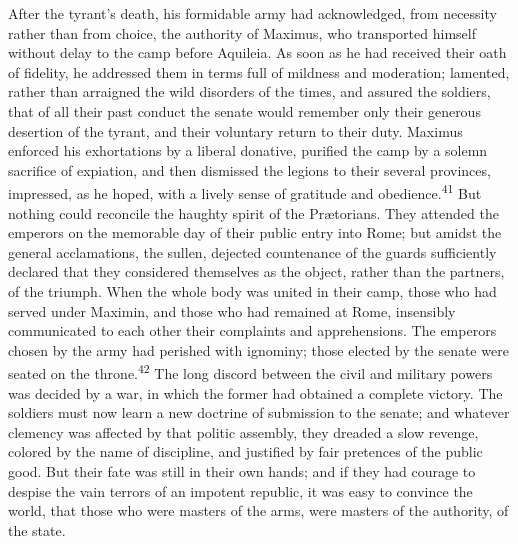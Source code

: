 After the tyrant’s death, his formidable army had acknowledged,
from necessity rather than from choice, the authority of Maximus,
who transported himself without delay to the camp before
Aquileia. As soon as he had received their oath of fidelity, he
addressed them in terms full of mildness and moderation;
lamented, rather than arraigned the wild disorders of the times,
and assured the soldiers, that of all their past conduct the
senate would remember only their generous desertion of the
tyrant, and their voluntary return to their duty. Maximus
enforced his exhortations by a liberal donative, purified the
camp by a solemn sacrifice of expiation, and then dismissed the
legions to their several provinces, impressed, as he hoped, with
a lively sense of gratitude and obedience.\textsuperscript{41} But nothing could
reconcile the haughty spirit of the Prætorians. They attended the
emperors on the memorable day of their public entry into Rome;
but amidst the general acclamations, the sullen, dejected
countenance of the guards sufficiently declared that they
considered themselves as the object, rather than the partners, of
the triumph. When the whole body was united in their camp, those
who had served under Maximin, and those who had remained at Rome,
insensibly communicated to each other their complaints and
apprehensions. The emperors chosen by the army had perished with
ignominy; those elected by the senate were seated on the throne.\textsuperscript{42}
The long discord between the civil and military powers was
decided by a war, in which the former had obtained a complete
victory. The soldiers must now learn a new doctrine of submission
to the senate; and whatever clemency was affected by that politic
assembly, they dreaded a slow revenge, colored by the name of
discipline, and justified by fair pretences of the public good.
But their fate was still in their own hands; and if they had
courage to despise the vain terrors of an impotent republic, it
was easy to convince the world, that those who were masters of
the arms, were masters of the authority, of the state.



